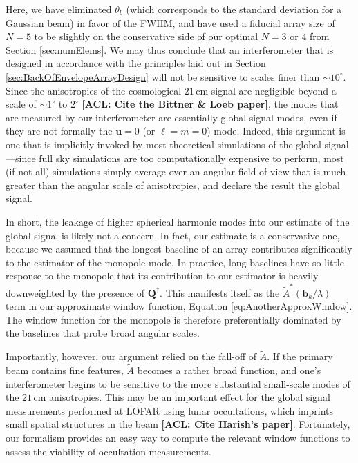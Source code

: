 \documentclass[twolcolumn,apj,iop,numberedappendix]{emulateapj}
\newcommand{\acl}[1]{{\color{red} \textbf{[ACL:  #1]}}}
\begin{document}
Here, we have eliminated $\theta_b$ (which corresponds to the standard deviation for a Gaussian beam) in favor of the FWHM, and have used a fiducial array size of $N=5$ to be slightly on the conservative side of our optimal $N=3$ or $4$ from Section \ref{sec:numElems}. We may thus conclude that an interferometer that is designed in accordance with the principles laid out in Section \ref{sec:BackOfEnvelopeArrayDesign} will not be sensitive to scales finer than $\sim 10^\circ$. Since the anisotropies of the cosmological $21\,\textrm{cm}$ signal are negligible beyond a scale of $\sim 1^\circ$ to $2^\circ$ \acl{Cite the Bittner \& Loeb paper}, the modes that are measured by our interferometer are essentially global signal modes, even if they are not formally the $\mathbf{u} = 0$ (or $\ell = m = 0$) mode. Indeed, this argument is one that is implicitly invoked by most theoretical simulations of the global signal---since full sky simulations are too computationally expensive to perform, most (if not all) simulations simply average over an angular field of view that is much greater than the angular scale of anisotropies, and declare the result the global signal.

In short, the leakage of higher spherical harmonic modes into our estimate of the global signal is likely not a concern. In fact, our estimate is a conservative one, because we assumed that the longest baseline of an array contributes significantly to the estimator of the monopole mode. In practice, long baselines have so little response to the monopole that its contribution to our estimator is heavily downweighted by the presence of $\mathbf{Q}^\dagger$. This manifests itself as the $\widetilde{A}^* ( \mathbf{b}_k / \lambda )$ term in our approximate window function, Equation \eqref{eq:AnotherApproxWindow}. The window function for the monopole is therefore preferentially dominated by the baselines that probe broad angular scales.

Importantly, however, our argument relied on the fall-off of $\widetilde{A}$. If the primary beam contains fine features, $\widetilde{A}$ becomes a rather broad function, and one's interferometer begins to be sensitive to the more substantial small-scale modes of the $21\,\textrm{cm}$ anisotropies. This may be an important effect for the global signal measurements performed at LOFAR using lunar occultations, which imprints small spatial structures in the beam \acl{Cite Harish's paper}. Fortunately, our formalism provides an easy way to compute the relevant window functions to assess the viability of occultation measurements.
\end{document}
